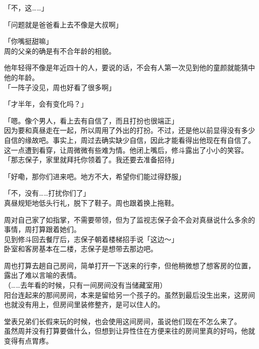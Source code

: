 「不，这……」

「问题就是爸爸看上去不像是大叔啊」

「你嘴挺甜嘛」\\

周的父亲的确是有不合年龄的相貌。

他年轻得不像是年近四十的人，要说的话，不会有人第一次见到他的童颜就能猜中他的年龄。\\

「一阵子没见，周也好看了很多啊」

「才半年，会有变化吗？」

「嗯。像个男人，看上去有自信了，而且打扮也很端正」\\

因为要和真昼走在一起，所以周用了外出的打扮。不过，还是他以前显得没有多少自信的缘故吧。事实上，周过去确实缺少自信，因此才能看得出他现在有自信了。\\

这一点遭到看穿，让周微微有些难为情。他闭上嘴后，修斗露出了小小的笑容。\\

「那志保子，家里就拜托你领着了。我还要去准备招待」

「好嘞，那你们进来吧。地方不大，希望你们能过得舒服」

「不，没有……打扰你们了」\\

真昼规矩地低头行礼，脱下了鞋子。周也跟着换上拖鞋。

周对自己家了如指掌，不需要带领，但为了监视志保子会不会对真昼说什么多余的事情，周打算跟着她们。\\

见到修斗回去餐厅后，志保子朝着楼梯招手说「这边～」\\

卧室和客房基本在二楼，志保子是想带去那边吧。

周也打算去趟自己房间，简单打开一下送来的行李，但他稍微想了想客房的位置，露出了难以言喻的表情。\\

（……去年看的时候，只有一间房间没有当储藏室用）\\

阳台连起来的那间房间，本来是留给另一个孩子的。虽然到最后没生出来，这房间也就没有用上，但房间里装修整齐，是可以住人的。

堂表兄弟们长假来玩的时候，也会使用这间房间，虽说他们现在不怎么来了。\\

虽然周并没有打算要做什么，但想到让异性住在方便来往的房间里真的好吗，他就变得有点胃疼。\\

